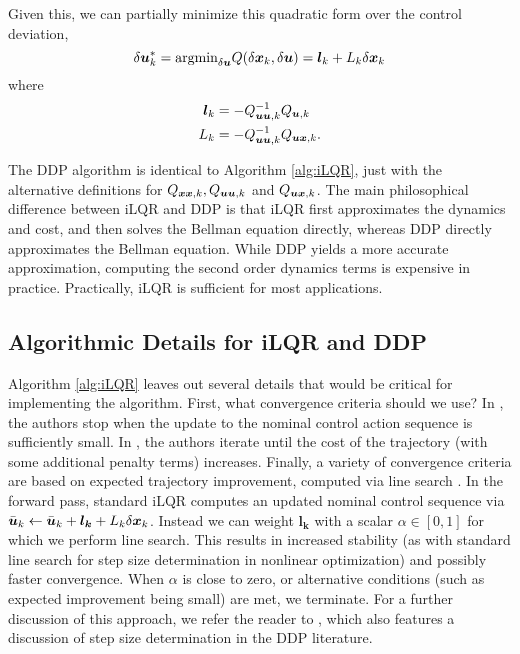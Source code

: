 Given this, we can partially minimize this quadratic form over the control deviation,
\begin{equation}
    \delta \bm{u}_k^* = \text{argmin}_{\delta \bm{u}} Q(\delta \bm{x}_k, \delta \bm{u}) = \bm{l}_k + L_k \delta \bm{x}_k
\end{equation}
where 
\begin{align}
    \bm{l}_k &= - Q_{\bm{u} \bm{u},k}^{-1} Q_{\bm{u},k}\\
    L_k &= - Q_{\bm{u} \bm{u},k}^{-1} Q_{\bm{u} \bm{x},k}. 
\end{align}

The DDP algorithm is identical to Algorithm \ref{alg:iLQR}, just with the alternative definitions for $Q_{\bm{x} \bm{x},k}, Q_{\bm{u} \bm{u},k}$ and $Q_{\bm{u} \bm{x},k}$. The main philosophical difference between iLQR and DDP is that iLQR first approximates the dynamics and cost, and then solves the Bellman equation directly, whereas DDP directly approximates the Bellman equation. While DDP yields a more accurate approximation, computing the second order dynamics terms is expensive in practice. Practically, iLQR is sufficient for most applications. 

\subsection{Algorithmic Details for iLQR and DDP}


Algorithm \ref{alg:iLQR} leaves out several details that would be critical for implementing the algorithm. First, what convergence criteria should we use? In \cite{todorov2005generalized}, the authors stop when the update to the nominal control action sequence is sufficiently small. In \cite{levine2014learning}, the authors iterate until the cost of the trajectory (with some additional penalty terms) increases. Finally, a variety of convergence criteria are based on expected trajectory improvement, computed via line search \cite{mayne1970ddp, tassa2012synthesis}.
In the forward pass, standard iLQR computes an updated nominal control sequence via $\bar{\bm{u}}_k \gets \bar{\bm{u}}_k + \bm{l_k} + L_k \delta \bm{x}_k$. Instead we can weight $\bm{l_k}$ with a scalar $\alpha \in [0,1]$ for which we perform line search. This results in increased stability (as with standard line search for step size determination in nonlinear optimization) and possibly faster convergence. When $\alpha$ is close to zero, or alternative conditions (such as expected improvement being small) are met, we terminate. For a further discussion of this approach, we refer the reader to \cite{tassa2012synthesis}, which also features a discussion of step size determination in the DDP literature.

